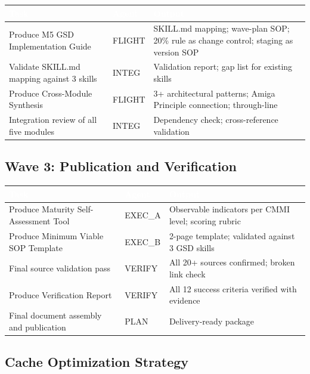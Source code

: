 \documentclass[11pt,letterpaper]{article}
\newcommand{\tableheader}[1]{\textbf{\sffamily\textcolor{white}{#1}}}
\begin{document}
\begin{center}
\begin{tabularx}{\textwidth}{L{4.5cm}L{2cm}X}
\toprule
{}
\tableheader{Task} & \tableheader{Agent} & \tableheader{Output} \\
\midrule
Produce M5 GSD Implementation Guide & FLIGHT & SKILL.md mapping; wave-plan SOP; 20\% rule as change control; staging as version SOP \\
Validate SKILL.md mapping against 3 skills & INTEG & Validation report; gap list for existing skills \\
Produce Cross-Module Synthesis & FLIGHT & 3+ architectural patterns; Amiga Principle connection; through-line \\
Integration review of all five modules & INTEG & Dependency check; cross-reference validation \\
\bottomrule
\end{tabularx}
\end{center}

\subsection{Wave 3: Publication and Verification}

\begin{center}
\begin{tabularx}{\textwidth}{L{4.5cm}L{2cm}X}
\toprule
{}
\tableheader{Task} & \tableheader{Agent} & \tableheader{Output} \\
\midrule
Produce Maturity Self-Assessment Tool & EXEC\_A & Observable indicators per CMMI level; scoring rubric \\
Produce Minimum Viable SOP Template & EXEC\_B & 2-page template; validated against 3 GSD skills \\
Final source validation pass & VERIFY & All 20+ sources confirmed; broken link check \\
Produce Verification Report & VERIFY & All 12 success criteria verified with evidence \\
Final document assembly and publication & PLAN & Delivery-ready package \\
\bottomrule
\end{tabularx}
\end{center}

\subsection{Cache Optimization Strategy}
\end{document}
